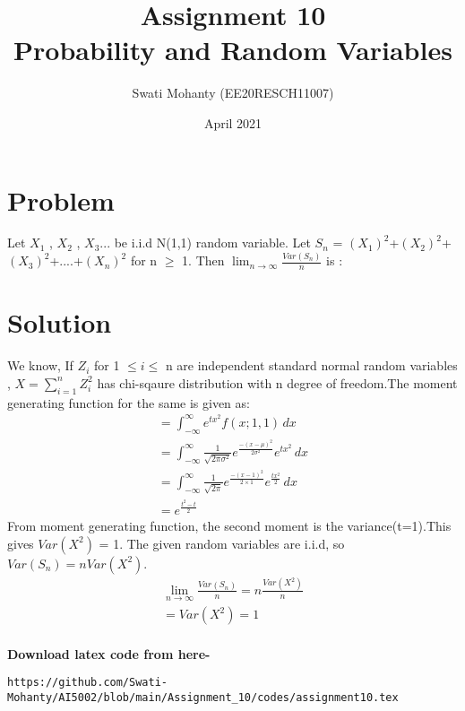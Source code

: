 \documentclass[journal,12pt,twocolumn]{IEEEtran}
\title{Assignment 10
\\Probability and Random Variables }
\author{Swati Mohanty (EE20RESCH11007) }
\date{April 2021}
\begin{document}
\maketitle


\section{Problem}
Let $X_1$ , $X_2$ , $X_3$...  be i.i.d N(1,1) random variable. Let  $S_n$ =  $(X_1)^2$+$(X_2)^2$+$(X_3)^2$+....+$(X_n)^2$ for n $\geq $ 1. Then $ \lim_{n\to\infty} \frac{Var (S_n)}{n}$  is :

\section{Solution}
We know, If $Z_i$ for 1 $\leq i \leq$ n are independent standard normal random variables , $X = \sum_{i=1} ^{n}Z_i^2$ has chi-sqaure distribution with n degree of freedom.The moment generating function for the same is given as:
\begin{align}
 = \int_{-\infty}^{\infty} e^{ tx^2}f(x;1,1) \,dx
    \\ = \int_{-\infty}^{\infty} \frac{1}{\sqrt{2\pi\sigma^2}}e^{\frac{-(x-\mu)^2}{2\sigma^2}}e^{ tx^2} \,dx 
    \\ = \int_{-\infty}^{\infty} \frac{1}{\sqrt{2\pi}}e^{\frac{-(x-1)^2}{2 \times 1}}e^{ \frac{tx^2}{2}} \,dx 
    \\= e^{\frac{t^2 - t}{2}}
\end{align}
From moment generating function, the second moment is the variance(t=1).This gives $Var(X^2)$ = 1.
The given random variables are i.i.d,  so ${Var (S_n)} = n {Var (X^2)}$.
\begin{align}
     \lim_{n\to\infty} \frac{Var (S_n)}{n} = n \frac{Var (X^2)}{n}
     \\={Var (X^2)} = 1
\end{align}
\\\textbf{Download latex code from here-}\\
\begin{lstlisting}
https://github.com/Swati-Mohanty/AI5002/blob/main/Assignment_10/codes/assignment10.tex
\end{lstlisting}
\end{document}
